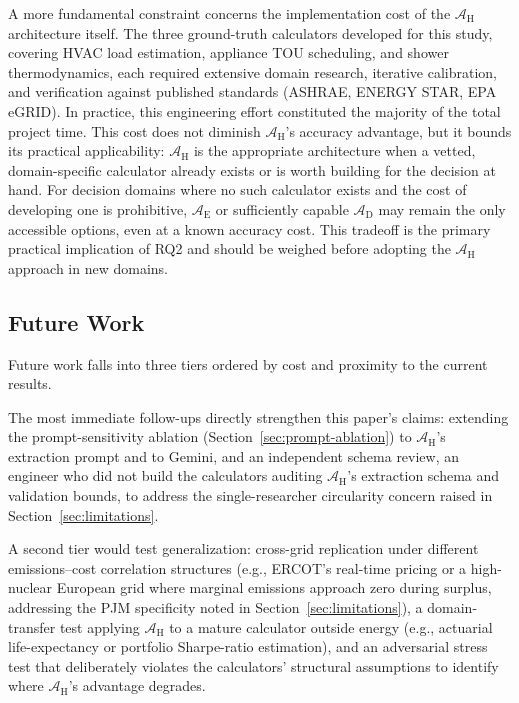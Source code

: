 \documentclass[final,3p,times]{elsarticle}
\begin{document}
A more fundamental constraint concerns the implementation cost of the
$\mathcal{A}_{\text{H}}$ architecture itself. The three ground-truth calculators developed
for this study, covering HVAC load estimation, appliance TOU scheduling,
and shower thermodynamics, each required extensive domain research,
iterative calibration, and verification against published standards
(ASHRAE, ENERGY STAR, EPA eGRID). In practice, this engineering effort
constituted the majority of the total project time. This cost does not
diminish $\mathcal{A}_{\text{H}}$'s accuracy advantage, but it bounds its practical
applicability: $\mathcal{A}_{\text{H}}$ is the appropriate architecture when a vetted,
domain-specific calculator already exists or is worth building for the
decision at hand. For decision domains where no such calculator exists
and the cost of developing one is prohibitive, $\mathcal{A}_{\text{E}}$ or
sufficiently capable $\mathcal{A}_{\text{D}}$ may remain the only accessible
options, even at a known accuracy cost. This tradeoff is the primary
practical implication of RQ2 and should be weighed before
adopting the $\mathcal{A}_{\text{H}}$ approach in new domains.



\subsection{Future Work}
\label{sec:futurework}
Future work falls into three tiers ordered by cost and proximity to the current results.

The most immediate follow-ups directly strengthen this paper's claims: extending the prompt-sensitivity ablation (Section~\ref{sec:prompt-ablation}) to $\mathcal{A}_{\text{H}}$'s extraction prompt and to Gemini, and an independent schema review, an engineer who did not build the calculators auditing $\mathcal{A}_{\text{H}}$'s extraction schema and validation bounds, to address the single-researcher circularity concern raised in Section~\ref{sec:limitations}.

A second tier would test generalization: cross-grid replication under different emissions--cost correlation structures (e.g., ERCOT's real-time pricing or a high-nuclear European grid where marginal emissions approach zero during surplus, addressing the PJM specificity noted in Section~\ref{sec:limitations}), a domain-transfer test applying $\mathcal{A}_{\text{H}}$ to a mature calculator outside energy (e.g., actuarial life-expectancy or portfolio Sharpe-ratio estimation), and an adversarial stress test that deliberately violates the calculators' structural assumptions to identify where $\mathcal{A}_{\text{H}}$'s advantage degrades.
\end{document}
